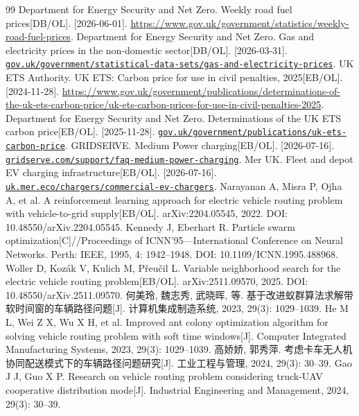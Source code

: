 \documentclass{setp-new}
\begin{document}
\begin{thebibliography}{99}
 Department for Energy Security and Net Zero. Weekly road fuel prices[DB/OL]. [2026-06-01]. \url{https://www.gov.uk/government/statistics/weekly-road-fuel-prices}.
 Department for Energy Security and Net Zero. Gas and electricity prices in the non-domestic sector[DB/OL]. [2026-03-31]. \href{https://www.gov.uk/government/statistical-data-sets/gas-and-electricity-prices-in-the-non-domestic-sector}{\nolinkurl{gov.uk/government/statistical-data-sets/gas-and-electricity-prices}}.
 UK ETS Authority. UK ETS: Carbon price for use in civil penalties, 2025[EB/OL]. [2024-11-28]. \url{https://www.gov.uk/government/publications/determinations-of-the-uk-ets-carbon-price/uk-ets-carbon-prices-for-use-in-civil-penalties-2025}.
 Department for Energy Security and Net Zero. Determinations of the UK ETS carbon price[EB/OL]. [2025-11-28]. \href{https://www.gov.uk/government/publications/determinations-of-the-uk-ets-carbon-price}{\nolinkurl{gov.uk/government/publications/uk-ets-carbon-price}}.
 GRIDSERVE. Medium Power charging[EB/OL]. [2026-07-16]. \href{https://www.gridserve.com/support/faq-medium-power-charging/}{\nolinkurl{gridserve.com/support/faq-medium-power-charging}}.
 Mer UK. Fleet and depot EV charging infrastructure[EB/OL]. [2026-07-16]. \href{https://uk.mer.eco/chargers/commercial-ev-chargers/}{\nolinkurl{uk.mer.eco/chargers/commercial-ev-chargers}}.
 Narayanan A, Misra P, Ojha A, et al. A reinforcement learning approach for electric vehicle routing problem with vehicle-to-grid supply[EB/OL]. arXiv:2204.05545, 2022. DOI: 10.48550/arXiv.2204.05545.
 Kennedy J, Eberhart R. Particle swarm optimization[C]//Proceedings of ICNN'95---International Conference on Neural Networks. Perth: IEEE, 1995, 4: 1942--1948. DOI: 10.1109/ICNN.1995.488968.
 Woller D, Koz\'ak V, Kulich M, P\v{r}eu\v{c}il L. Variable neighborhood search for the electric vehicle routing problem[EB/OL]. arXiv:2511.09570, 2025. DOI: 10.48550/arXiv.2511.09570.
 何美玲, 魏志秀, 武晓晖, 等. 基于改进蚁群算法求解带软时间窗的车辆路径问题[J]. 计算机集成制造系统, 2023, 29(3): 1029--1039. He M L, Wei Z X, Wu X H, et al. Improved ant colony optimization algorithm for solving vehicle routing problem with soft time windows[J]. Computer Integrated Manufacturing Systems, 2023, 29(3): 1029--1039.
 高娇娇, 郭秀萍. 考虑卡车无人机协同配送模式下的车辆路径问题研究[J]. 工业工程与管理, 2024, 29(3): 30--39. Gao J J, Guo X P. Research on vehicle routing problem considering truck-UAV cooperative distribution mode[J]. Industrial Engineering and Management, 2024, 29(3): 30--39.

\end{thebibliography}
\end{document}
